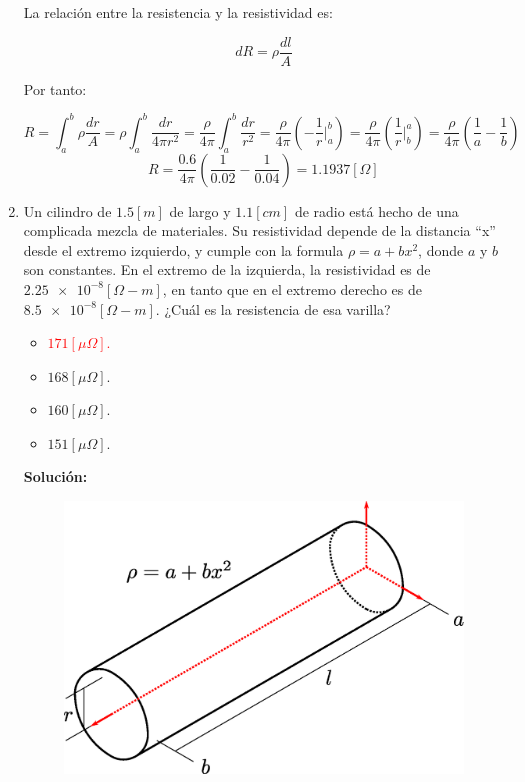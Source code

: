 \documentclass[letter,11pt]{article}
\begin{document}
\begin{enumerate}
La relación entre la resistencia y la resistividad es:

\begin{equation*}
    dR = \rho \frac{dl}{A}
\end{equation*}

Por tanto:

\begin{equation*}
    R = \int_{a}^{b}\rho\frac{dr}{A}
      = \rho\int_{a}^{b}\frac{dr}{4\pi r^2}
      = \frac{\rho}{4\pi}\int_{a}^{b}\frac{dr}{r^2}
      = \frac{\rho}{4\pi}\left(-\frac{1}{r}\Biggr|_{a}^{b}\right)
      = \frac{\rho}{4\pi}\left(\frac{1}{r}\Biggr|_{b}^{a}\right)
      = \frac{\rho}{4\pi}\left(\frac{1}{a}-\frac{1}{b}\right)
\end{equation*}
\begin{equation*}
    R = \frac{0.6}{4\pi}\left(\frac{1}{0.02}-\frac{1}{0.04}\right)
      = 1.1937 [\Omega]
\end{equation*}

\item Un cilindro de $1.5 [m]$ de largo y $1.1 [cm]$ de radio está hecho de una
complicada mezcla de materiales. Su resistividad depende de la distancia ``x''
desde el extremo izquierdo, y cumple con la formula $\rho = a + bx^2$, donde
$a$ y $b$ son constantes. En el extremo de la izquierda, la resistividad es de
$\num{2.25e-8} [\Omega-m]$, en tanto que en el extremo derecho es de
$\num{8.5e-8} [\Omega-m]$. ¿Cuál es la resistencia de esa varilla?

\begin{itemize}
    \item \textcolor{red}{$171 [\mu\Omega]$.}
    \item $168 [\mu\Omega]$.
    \item $160 [\mu\Omega]$.
    \item $151 [\mu\Omega]$.
\end{itemize}

\textbf{Solución:}

\begin{figure}[!h]
\centering
\includegraphics[scale=0.40]{resources/a2.eps}
\end{figure}


\end{enumerate}
\end{document}

